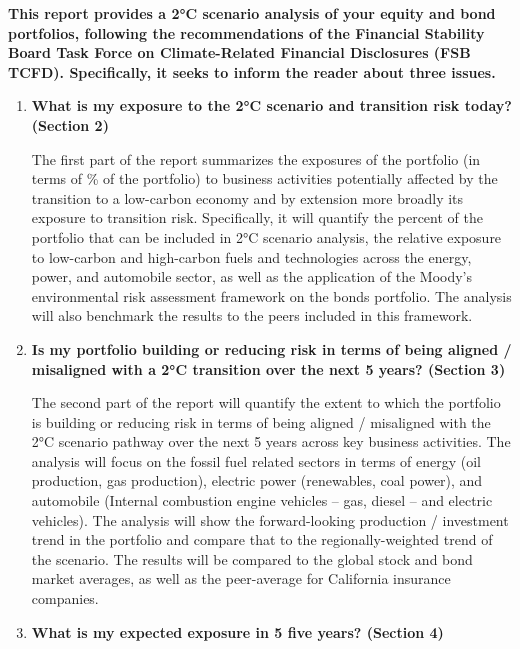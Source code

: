 \documentclass[10pt,table,a4]{article}\usepackage[]{graphicx}\usepackage[]{color}
\begin{document}
	\begin{multicols}{2}
	
		\textbf{This report provides a 2°C scenario analysis of your equity and bond portfolios, following the recommendations of the Financial Stability Board Task Force on Climate-Related Financial Disclosures (FSB TCFD). Specifically, it seeks to inform the reader about three issues.}
		
		\begin{enumerate}
			\item{\textbf{What is my exposure to the 2°C scenario and transition risk today? (Section 2)}
			}
			
			The first part of the report summarizes the exposures of the portfolio (in terms of \% of the portfolio) to business activities potentially affected by the transition to a low-carbon economy and by extension more broadly its exposure to transition risk. Specifically, it will quantify the percent of the portfolio that can be included in 2°C scenario analysis, the relative exposure to low-carbon and high-carbon fuels and technologies across the energy, power, and automobile sector, as well as the application of the Moody’s environmental risk assessment framework on the bonds portfolio. The analysis will also benchmark the results to the peers included in this framework.
			
			\item{\textbf{Is my portfolio building or reducing risk in terms of being aligned / misaligned with a 2°C transition over the next 5 years? (Section 3)}
			}
			
			The second part of the report will quantify the extent to which the portfolio is building or reducing risk in terms of being aligned / misaligned with the 2°C scenario pathway over the next 5 years across key business activities. The analysis will focus on the fossil fuel related sectors in terms of energy (oil production, gas production), electric power (renewables, coal power), and automobile (Internal combustion engine vehicles – gas, diesel – and electric vehicles). The analysis will show the forward-looking production / investment trend in the portfolio and compare that to the regionally-weighted trend of the scenario. The results will be compared to the global stock and bond market averages, as well as the peer-average for California insurance companies.
			
			\item{\textbf{What is my expected exposure in 5 five years? (Section 4)}
			}
			

\end{enumerate}
\end{multicols}
\end{document}
